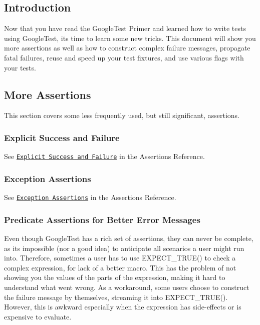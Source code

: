 \subsection*{Introduction}

Now that you have read the Google\+Test Primer and learned how to write tests using Google\+Test, it\textquotesingle{}s time to learn some new tricks. This document will show you more assertions as well as how to construct complex failure messages, propagate fatal failures, reuse and speed up your test fixtures, and use various flags with your tests.

\subsection*{More Assertions}

This section covers some less frequently used, but still significant, assertions.

\subsubsection*{Explicit Success and Failure}

See \href{reference/assertions.md#success-failure}{\tt Explicit Success and Failure} in the Assertions Reference.

\subsubsection*{Exception Assertions}

See \href{reference/assertions.md#exceptions}{\tt Exception Assertions} in the Assertions Reference.

\subsubsection*{Predicate Assertions for Better Error Messages}

Even though Google\+Test has a rich set of assertions, they can never be complete, as it\textquotesingle{}s impossible (nor a good idea) to anticipate all scenarios a user might run into. Therefore, sometimes a user has to use {\ttfamily E\+X\+P\+E\+C\+T\+\_\+\+T\+R\+U\+E()} to check a complex expression, for lack of a better macro. This has the problem of not showing you the values of the parts of the expression, making it hard to understand what went wrong. As a workaround, some users choose to construct the failure message by themselves, streaming it into {\ttfamily E\+X\+P\+E\+C\+T\+\_\+\+T\+R\+U\+E()}. However, this is awkward especially when the expression has side-\/effects or is expensive to evaluate.

